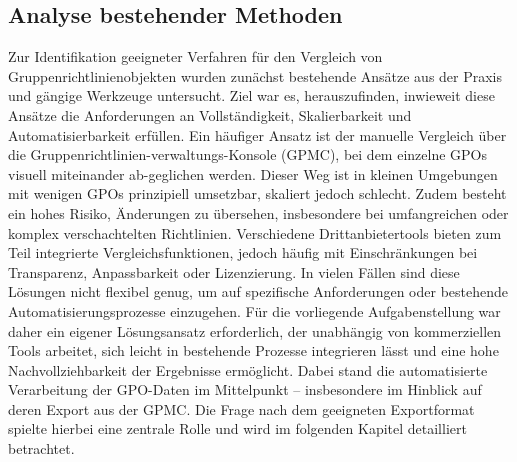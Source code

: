 \subsection{Analyse bestehender Methoden}
    Zur Identifikation geeigneter Verfahren für den Vergleich von Gruppenrichtlinienobjekten wurden zunächst bestehende Ansätze aus der Praxis und gängige Werkzeuge untersucht. Ziel war es, herauszufinden, inwieweit diese Ansätze die Anforderungen an Vollständigkeit, Skalierbarkeit und Automatisierbarkeit erfüllen.\newline
    Ein häufiger Ansatz ist der manuelle Vergleich über die Gruppenrichtlinien-verwaltungs-Konsole (GPMC), bei dem einzelne GPOs visuell miteinander ab-geglichen werden. Dieser Weg ist in kleinen Umgebungen mit wenigen GPOs prinzipiell umsetzbar, skaliert jedoch schlecht. Zudem besteht ein hohes Risiko, Änderungen zu übersehen, insbesondere bei umfangreichen oder komplex verschachtelten Richtlinien.\newline
    Verschiedene Drittanbietertools bieten zum Teil integrierte Vergleichsfunktionen, jedoch häufig mit Einschränkungen bei Transparenz, Anpassbarkeit oder Lizenzierung. In vielen Fällen sind diese Lösungen nicht flexibel genug, um auf spezifische Anforderungen oder bestehende Automatisierungsprozesse einzugehen.\newline
    Für die vorliegende Aufgabenstellung war daher ein eigener Lösungsansatz erforderlich, der unabhängig von kommerziellen Tools arbeitet, sich leicht in bestehende Prozesse integrieren lässt und eine hohe Nachvollziehbarkeit der Ergebnisse ermöglicht. Dabei stand die automatisierte Verarbeitung der GPO-Daten im Mittelpunkt – insbesondere im Hinblick auf deren Export aus der GPMC. Die Frage nach dem geeigneten Exportformat spielte hierbei eine zentrale Rolle und wird im folgenden Kapitel detailliert betrachtet. 
